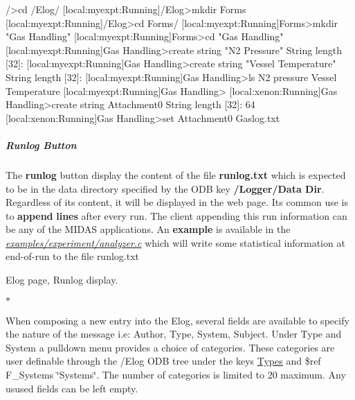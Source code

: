 \begin{DoxyCode}
/>cd /Elog/
[local:myexpt:Running]/Elog>mkdir Forms
[local:myexpt:Running]/Elog>cd Forms/
[local:myexpt:Running]Forms>mkdir "Gas Handling"
[local:myexpt:Running]Forms>cd "Gas Handling"
[local:myexpt:Running]Gas Handling>create string "N2 Pressure"
String length [32]: 
[local:myexpt:Running]Gas Handling>create string "Vessel Temperature"
String length [32]: 
[local:myexpt:Running]Gas Handling>ls
N2 pressure              
Vessel Temperature              
[local:myexpt:Running]Gas Handling>
[local:xenon:Running]Gas Handling>create string Attachment0 
String length [32]: 64
[local:xenon:Running]Gas Handling>set Attachment0 Gaslog.txt
\end{DoxyCode}
\hypertarget{RC_mhttpd_Elog_page_RC_mhttpd_Internal_Elog_runlog}{}\subparagraph{Runlog Button}\label{RC_mhttpd_Elog_page_RC_mhttpd_Internal_Elog_runlog}

\begin{DoxyItemize}
\item The {\bfseries runlog} button display the content of the file {\bfseries runlog.txt} which is expected to be in the data directory specified by the ODB key {\bfseries /Logger/Data Dir}. Regardless of its content, it will be displayed in the web page. Its common use is to {\bfseries append} {\bfseries lines} after every run. The client appending this run information can be any of the MIDAS applications. An {\bfseries  example } is available in the {\itshape \hyperlink{analyzer_8c}{examples/experiment/analyzer.c}\/} which will write some statistical information at end-\/of-\/run to the file runlog.txt
\end{DoxyItemize}

\par
\par
\par
 \begin{center}  Elog page, Runlog display. \par
\par
\par
  \end{center}  $\ast$ \par
\par
\par



\begin{DoxyItemize}
\item When composing a new entry into the Elog, several fields are available to specify the nature of the message i.e: Author, Type, System, Subject. Under Type and System a pulldown menu provides a choice of categories. These categories are user definable through the /Elog ODB tree under the keys \hyperlink{F_Elog_F_Types}{Types} and \$ref F\_\-Systems \char`\"{}Systems\char`\"{}. The number of categories is limited to 20 maximum. Any usused fields can be left empty.
\end{DoxyItemize}

